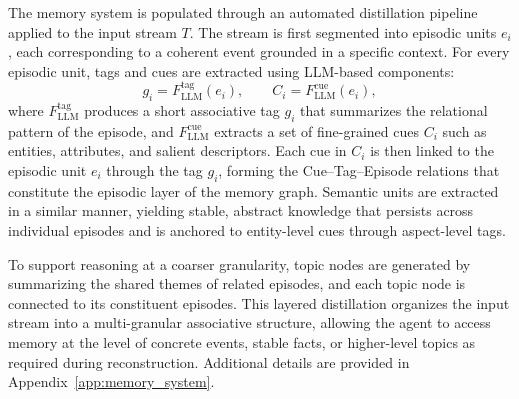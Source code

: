 The memory system is populated through an automated distillation pipeline
applied to the input stream $T$. The stream is first segmented into episodic
units $e_i$, each corresponding to a coherent event grounded in a specific
context. For every episodic unit, tags and cues are extracted using LLM-based
components:
\begin{equation}
    g_i = F_{\text{LLM}}^{\text{tag}}(e_i), \qquad
    C_i = F_{\text{LLM}}^{\text{cue}}(e_i),
\end{equation}
where $F_{\text{LLM}}^{\text{tag}}$ produces a short associative tag $g_i$ that
summarizes the relational pattern of the episode, and
$F_{\text{LLM}}^{\text{cue}}$ extracts a set of fine-grained cues $C_i$ such as
entities, attributes, and salient descriptors. Each cue in $C_i$ is then linked
to the episodic unit $e_i$ through the tag $g_i$, forming the Cue--Tag--Episode
relations that constitute the episodic layer of the memory graph.
Semantic units are extracted in a similar manner, yielding stable, abstract
knowledge that persists across individual episodes and is anchored to
entity-level cues through aspect-level tags. 

To support reasoning at a coarser
granularity, topic nodes are generated by summarizing the shared themes of
related episodes, and each topic node is connected to its constituent episodes.
This layered distillation organizes the input stream into a multi-granular
associative structure, allowing the agent to access memory at the level of
concrete events, stable facts, or higher-level topics as required during
reconstruction.
Additional details are provided in Appendix~\ref{app:memory_system}.
